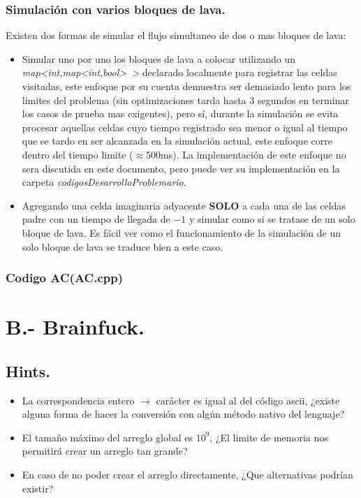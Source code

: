 \documentclass[12pt,letterpaper,titlepage]{article}
\begin{document}
	\subsubsection{Simulación con varios bloques de lava.}
	Existen dos formas de simular el flujo simultaneo de dos o mas bloques de lava:
	\begin{itemize}
		\item Simular uno por uno los bloques de lava a colocar utilizando un \textit{map<int,map<int,bool>~>} declarado localmente para registrar las celdas visitadas, este enfoque por su cuenta demuestra ser demasiado lento para los limites del problema (sin optimizaciones tarda hasta 3 segundos en terminar los casos de prueba mas exigentes), pero sí, durante la simulación se evita procesar aquellas celdas cuyo tiempo registrado sea menor o igual al tiempo que se tardo en ser alcanzada en la simulación actual, este enfoque corre dentro del tiempo limite ($\approx$500ms). La implementación de este enfoque no sera discutida en este documento, pero puede ver su implementación en la carpeta \textit{codigosDesarrolloProblemario}.
		\item Agregando una celda imaginaria adyacente \textbf{SOLO} a cada una de las celdas padre con un tiempo de llegada de $-1$ y simular como si se tratase de un solo bloque de lava. Es fácil ver como el funcionamiento de la simulación de un solo bloque de lava se traduce bien a este caso.
	\end{itemize}
	\subsubsection{Codigo AC(AC.cpp)}
	
\clearpage\section{B.- Brainfuck.}	
	\subsection{Hints.}
	\begin{itemize}
		\item La correspondencia entero $\rightarrow$ carácter es igual al del código ascii, ¿existe alguna forma de hacer la conversión con algún método nativo del lenguaje?
		\item El tamaño máximo del arreglo global es $10^{9}$, ¿El limite de memoria nos permitirá crear un arreglo tan grande?
		\item En caso de no poder crear el arreglo directamente, ¿Que alternativas podrían existir?
	\end{itemize}
\end{document}
